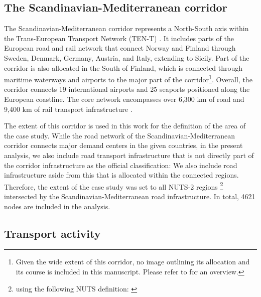 \documentclass[preprint,10pt,review, authoryear]{elsarticle}
\begin{document}
    \subsection{The Scandinavian-Mediterranean corridor}
        The Scandinavian-Mediterranean corridor represents a North-South axis within the Trans-European Transport Network (TEN-T) \citep{EU_TEN_T}. It includes parts of the European road and rail network that connect Norway and Finland through Sweden, Denmark, Germany, Austria, and Italy, extending to Sicily. Part of the corridor is also allocated in the South of Finland, which is connected through maritime waterways and airports to the major part of the corridor\footnote{Given the wide extent of this corridor, no image outlining its allocation and its course is included in this manuscript. Please refer to \citep{EU_TEN_T_Maps} for an overview.}. Overall, the corridor connects 19 international airports and 25 seaports positioned along the European coastline. The core network encompasses over 6,300 km of road and 9,400 km of rail transport infrastructure \citep{EU_SCM_Corridor_Study}. 

        The extent of this corridor is used in this work for the definition of the area of the case study. While the road network of the Scandinavian-Mediterranean corridor connects major demand centers in the given countries, in the present analysis, we also include road transport infrastructure that is not directly part of the corridor infrastructure as the official classification: We also include road infrastructure aside from this that is allocated within the connected regions. Therefore, the extent of the case study was set to all NUTS-2 regions \footnote{using the following NUTS definition: \citep{EU_Eurostat_NUTS}} intersected by the Scandinavian-Mediterranean road infrastructure. In total, 4621 nodes are included in the analysis.
    \subsection{Transport activity}
        
\end{document}
